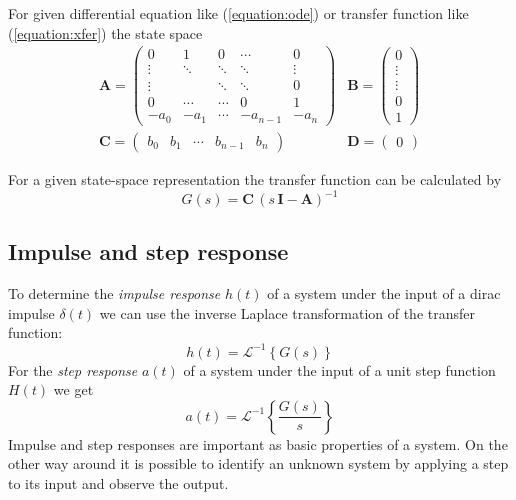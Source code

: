 \documentclass[a4paper,12pt]{article}
\newcommand{\Mat}[1]{\mathbf{#1}}
\newcommand{\SubSection}[2]{\subsection{#2}\label{subsection:#1}}
\newcommand{\ERef}[1]{(\ref{equation:#1})}
\begin{document}
For given differential equation like \ERef{ode} or transfer function like
\ERef{xfer} the state space 
\begin{equation}
\begin{array}{ll}
\Mat{A}=\left(\begin{array}{ccccc}
0 & 1 & 0 & \cdots & 0\\
\vdots & \ddots & \ddots & \ddots & \vdots\\
\vdots & & \ddots & \ddots & 0\\
0 & \cdots & \cdots & 0 & 1\\
-a_0 & -a_1 & \cdots & -a_{n-1} & -a_n
\end{array}\right)
&
\Mat{B}=\left(\begin{array}{c}
0\\
\vdots\\
\vdots\\
0\\
1
\end{array}\right)\\
\Mat{C}=\left(\begin{array}{ccccc}
b_0 & b_1 & \cdots & b_{n-1} & b_n
\end{array}\right)
&
\Mat{D}=\left(\begin{array}{c}
0
\end{array}\right)
\end{array}
\end{equation}

For a given state-space representation the transfer function can be calculated
by
\begin{equation}
G(s)=\Mat{C}\,\left(s\,\Mat{I}-\Mat{A}\right)^{-1}
\end{equation}

\SubSection{pulsestep}{Impulse and step response}

To determine the {\em impulse response} $h(t)$ of a system under the input of a
dirac impulse $\delta(t)$ we can use the inverse Laplace transformation of the
transfer function:
\begin{equation}
h(t)=\mathcal{L}^{-1}\left\{G(s)\right\}
\end{equation}
For the {\em step response} $a(t)$ of a system under the input of a unit step
function $H(t)$ we get
\begin{equation}
a(t)=\mathcal{L}^{-1}\left\{\frac{G(s)}{s}\right\}
\end{equation}
Impulse and step responses are important as basic properties of a system. On
the other way around it is possible to identify an unknown system by applying
a step to its input and observe the output.
\end{document}
